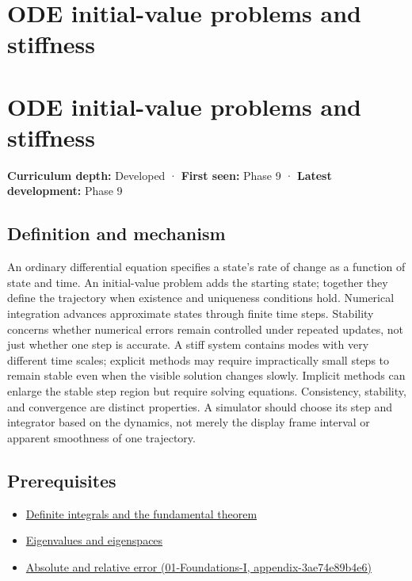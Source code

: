 \hypertarget{appendix-e8ab9836882e}{}
\section*{ODE initial-value problems and stiffness}
\section{ODE initial-value problems and stiffness}\label{ode-initial-value-problems-and-stiffness}

\textbf{Curriculum depth:} Developed · \textbf{First seen:} Phase 9 · \textbf{Latest development:} Phase 9

\subsection{Definition and mechanism}\label{definition-and-mechanism}

An ordinary differential equation specifies a state's rate of change as a function of state and time. An initial-value problem adds the starting state; together they define the trajectory when existence and uniqueness conditions hold. Numerical integration advances approximate states through finite time steps. Stability concerns whether numerical errors remain controlled under repeated updates, not just whether one step is accurate. A stiff system contains modes with very different time scales; explicit methods may require impractically small steps to remain stable even when the visible solution changes slowly. Implicit methods can enlarge the stable step region but require solving equations. Consistency, stability, and convergence are distinct properties. A simulator should choose its step and integrator based on the dynamics, not merely the display frame interval or apparent smoothness of one trajectory.

\subsection{Prerequisites}\label{prerequisites}

\begin{itemize}
\tightlist
\item
  \hyperref[appendix-1a50e72435c2]{Definite integrals and the fundamental theorem}
\item
  \hyperref[appendix-0b3be18411f9]{Eigenvalues and eigenspaces}
\item
  \href{}{Absolute and relative error (01-Foundations-I, appendix-3ae74e89b4e6)}
\end{itemize}

